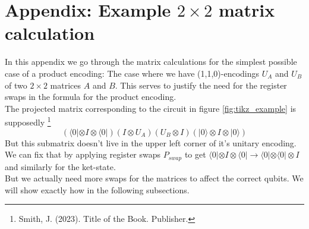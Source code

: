 \documentclass[11pt]{article}
\begin{document}
%
%
\newpage

\section*{Appendix: Example $2 \times 2$ matrix calculation}
In this appendix we go through the matrix calculations for the simplest possible case of a product encoding: The case where we have (1,1,0)-encodings $U_A$ and $U_B$ of two $2 \times 2$ matrices $A$ and $B$. This serves to justify the need for the register swaps in the formula for the product encoding.\\

The projected matrix corresponding to the circuit in figure \ref{fig:tikz_example} is supposedly \footnote{Smith, J. (2023). Title of the Book. Publisher.}
$$
(\langle 0| \otimes I \otimes \langle 0|) (I \otimes U_A) (U_B \otimes I) (|0\rangle \otimes I \otimes |0\rangle)
$$
But this submatrix doesn't live in the upper left corner of it's unitary encoding.\\

We can fix that by applying register swaps $P_{swap}$ to get $\langle 0| \otimes I \otimes \langle 0| \to \langle 0|  \otimes \langle 0| \otimes I$ and similarly for the ket-state. \\

But we actually need more swaps for the matrices to affect the correct qubits. We will show exactly how in the following subsections.
\end{document}
